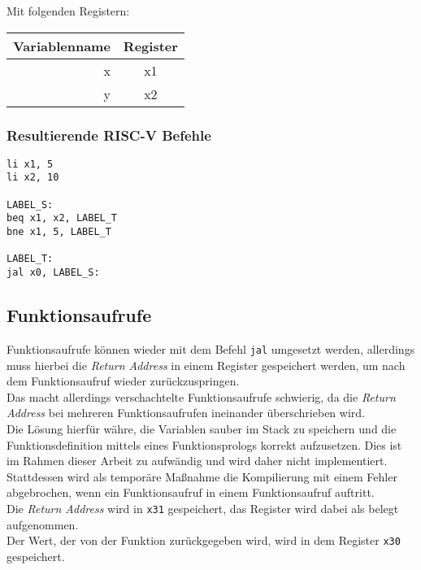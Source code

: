 Mit folgenden Registern:

\begin{table}[H]
  \begin{center}
    \begin{tabular}{| r | c |}
      \hline
      Variablenname & Register \\
      \hline
      x & x1 \\
      y & x2 \\
      \hline
    \end{tabular}
  \end{center}
\end{table}

\subsubsection{Resultierende RISC-V Befehle}

\begin{lstlisting}
li x1, 5
li x2, 10

LABEL_S:
beq x1, x2, LABEL_T
bne x1, 5, LABEL_T

LABEL_T:
jal x0, LABEL_S:
\end{lstlisting}

\subsection{Funktionsaufrufe}

Funktionsaufrufe können wieder mit dem Befehl \texttt{jal} umgesetzt werden, allerdings muss hierbei die \textit{Return Address} in einem Register gespeichert werden, um nach dem Funktionsaufruf wieder zurückzuspringen.\\
Das macht allerdings verschachtelte Funktionsaufrufe schwierig, da die \textit{Return Address} bei mehreren Funktionsaufrufen ineinander überschrieben wird.\\
Die Lösung hierfür währe, die Variablen sauber im Stack zu speichern und die Funktionsdefinition mittels eines Funktionsprologs korrekt aufzusetzen.
Dies ist im Rahmen dieser Arbeit zu aufwändig und wird daher nicht implementiert.\\
Stattdessen wird als temporäre Maßnahme die Kompilierung mit einem Fehler abgebrochen, wenn ein Funktionsaufruf in einem Funktionsaufruf auftritt.\\
Die \textit{Return Address} wird in \texttt{x31} gespeichert, das Register wird dabei als belegt aufgenommen.\\
Der Wert, der von der Funktion zurückgegeben wird, wird in dem Register \texttt{x30} gespeichert.\\

